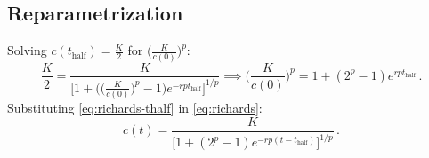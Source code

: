 \documentclass[12pt]{article}
\begin{document}
\subsection{Reparametrization}

Solving $c(t_\text{half}) = \frac{K}{2}$ for $\big(\frac{K}{c(0)}\big)^p$:
%
\begin{equation}
  \label{eq:richards-thalf}
  \frac{K}{2} = \frac{K}{\big[1 + \big(\big(\frac{K}{c(0)}\big)^p - 1\big) e^{-r p t_\text{half}}\big]^{1/p}} \implies \bigg(\frac{K}{c(0)}\bigg)^p = 1 + (2^p - 1) e^{r p t_\text{half}}\,.
\end{equation}
%
Substituting \eqref{eq:richards-thalf} in \eqref{eq:richards}:
%
\begin{equation}
  c(t) = \frac{K}{\big[1 + (2^p - 1) e^{-r p (t - t_\text{half})}\big]^{1/p}}\,.
\end{equation}
\end{document}
